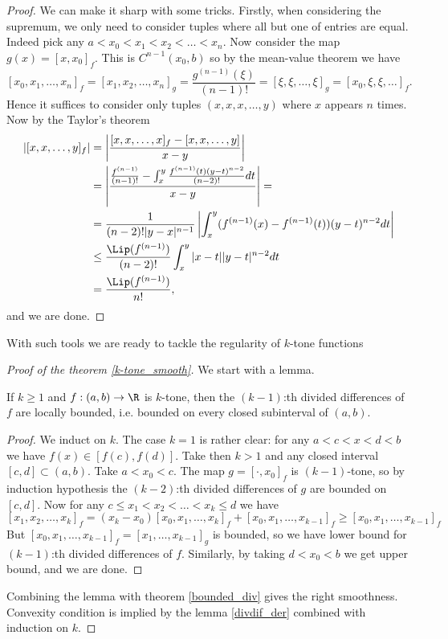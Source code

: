 \begin{proof}
	We can make it sharp with some tricks. Firstly, when considering the supremum, we only need to consider tuples where all but one of entries are equal. Indeed pick any $a < x_{0} < x_{1} < x_{2} < \ldots < x_{n}$. Now consider the map $g(x) = [x, x_{0}]_{f}$. This is $C^{n - 1}(x_{0}, b)$ so by the mean-value theorem we have
	\[
		[x_{0}, x_{1}, \ldots, x_{n}]_{f} = [x_{1}, x_{2}, \ldots, x_{n}]_{g} = \frac{g^{(n - 1)}(\xi)}{(n - 1)!} = [\xi, \xi, \ldots, \xi]_{g} = [x_{0}, \xi, \xi, \ldots]_{f}.
	\]
	Hence it suffices to consider only tuples $(x, x, x, \ldots, y)$ where $x$ appears $n$ times. Now by the Taylor's theorem
	\begin{align*}
		\left|[x, x, \ldots, y]_{f}\right| &= \left|\frac{[x, x, \ldots, x]_{f} - [x, x, \ldots, y]}{x - y} \right| \\
		&= \left|\frac{\frac{f^{(n - 1)}}{(n - 1)!} - \int_{x}^{y} \frac{f^{(n - 1)}(t) (y - t)^{n - 2}}{(n - 2)!} dt}{x - y} \right| = \\
		&= \frac{1}{(n - 2)!|y - x|^{n - 1}} \left|\int_{x}^{y} (f^{(n - 1)}(x) - f^{(n - 1)}(t)) (y - t)^{n - 2} dt \right| \\
		&\leq \frac{\Lip(f^{(n - 1)})}{(n - 2)!} \int_{x}^{y} |x - t| |y - t|^{n - 2} dt \\
		&= \frac{\Lip(f^{(n - 1)})}{n!},
	\end{align*}
	and we are done.
\end{proof}

With such tools we are ready to tackle the regularity of $k$-tone functions

\begin{proof}[Proof of the theorem \ref{k-tone_smooth}]

	We start with a lemma.
	\begin{lem}
		If $k \geq 1$ and $f : (a, b) \to \R$ is $k$-tone, then the $(k - 1)$:th divided differences of $f$ are locally bounded, i.e. bounded on every closed subinterval of $(a, b)$.
	\end{lem}
	\begin{proof}
		We induct on $k$. The case $k = 1$ is rather clear: for any $a < c < x < d < b$ we have $f(x) \in [f(c), f(d)]$. Take then $k > 1$ and any closed interval $[c, d] \subset (a, b)$. Take $a < x_{0} < c$. The map $g = [\cdot, x_{0}]_{f}$ is $(k - 1)$-tone, so by induction hypothesis the $(k - 2)$:th divided differences of $g$ are bounded on $[c, d]$. Now for any $c \leq x_{1} < x_{2} < \ldots < x_{k} \leq d$ we have
		\[
			[x_{1}, x_{2}, \ldots, x_{k}]_{f} = (x_{k} - x_{0}) [x_{0}, x_{1}, \ldots, x_{k}]_{f} + [x_{0}, x_{1}, \ldots, x_{k - 1}]_{f} \geq [x_{0}, x_{1}, \ldots, x_{k - 1}]_{f}
		\]
		But $[x_{0}, x_{1}, \ldots, x_{k - 1}]_{f} = [x_{1}, \ldots, x_{k - 1}]_{g}$ is bounded, so we have lower bound for $(k - 1)$:th divided differences of $f$. Similarly, by taking $d < x_{0} < b$ we get upper bound, and we are done.
	\end{proof}
	Combining the lemma with theorem \ref{bounded_div} gives the right smoothness. Convexity condition is implied by the lemma \ref{divdif_der} combined with induction on $k$.
\end{proof}

